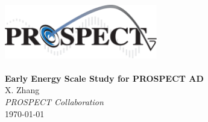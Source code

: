\begin{titlepage}

\begin{center}

\includegraphics[width=0.50\textwidth]{figures/PROSPECT_logo}\\[1cm]    

\HRule \\[0.4cm]
{\huge \bfseries Early Energy Scale Study for PROSPECT AD}
\HRule \\[1.5cm]


{\Large X. Zhang}\\
\emph{\Large PROSPECT Collaboration}\\


\vfill
{\large \today}

\end{center}

\end{titlepage}
\newpage
